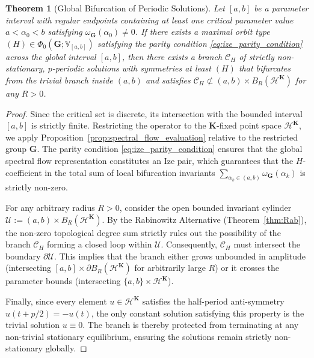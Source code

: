 \documentclass[twoside]{article}%
\newtheorem{theorem}{Theorem}[section]
\begin{document}
\begin{theorem}[Global Bifurcation of Periodic Solutions]\label{thm:global_bif_main}
Let $[a, b]$ be a parameter interval with regular endpoints containing at least one critical parameter value $a < \alpha_0 < b$ satisfying $\omega_{\bm G}(\alpha_0) \neq 0$. If there exists a maximal orbit type $(H) \in \Phi_0(\bm G; \mathbb V_{[a,b]})$ satisfying the parity condition \eqref{eq:ize_parity_condition} across the global interval $[a,b]$, then there exists a branch $\mathscr C_H$ of strictly non-stationary, $p$-periodic solutions with symmetries at least $(H)$ that bifurcates from the trivial branch inside $(a,b)$ and satisfies $\mathscr{C}_H \not\subset (a,b) \times B_R(\mathscr{H}^{\bm{K}})$ for any $R > 0$.
\end{theorem}
\begin{proof}
Since the critical set is discrete, its intersection with the bounded interval $[a,b]$ is strictly finite. Restricting the operator to the $\bm K$-fixed point space $\mathscr H^{\bm K}$, we apply Proposition~\ref{prop:spectral_flow_evaluation} relative to the restricted group $\bm G$. The parity condition \eqref{eq:ize_parity_condition} ensures that the global spectral flow representation constitutes an Ize pair, which guarantees that the $H$-coefficient in the total sum of local bifurcation invariants $\sum_{\alpha_k \in (a,b)} \omega_{\bm G}(\alpha_k)$ is strictly non-zero. 

For any arbitrary radius $R > 0$, consider the open bounded invariant cylinder $\mathcal U := (a,b) \times B_R(\mathscr H^{\bm K})$. By the Rabinowitz Alternative (Theorem~\ref{thm:Rab}), the non-zero topological degree sum strictly rules out the possibility of the branch $\mathscr C_H$ forming a closed loop within $\mathcal U$. Consequently, $\mathscr C_H$ must intersect the boundary $\partial \mathcal U$. This implies that the branch either grows unbounded in amplitude (intersecting $[a,b] \times \partial B_R(\mathscr H^{\bm K})$ for arbitrarily large $R$) or it crosses the parameter bounds (intersecting $\{a,b\} \times \mathscr H^{\bm K}$). 

Finally, since every element $u \in \mathscr H^{\bm K}$ satisfies the half-period anti-symmetry $u(t + p/2) = -u(t)$, the only constant solution satisfying this property is the trivial solution $u \equiv 0$. The branch is thereby protected from terminating at any non-trivial stationary equilibrium, ensuring the solutions remain strictly non-stationary globally.
\end{proof}
\end{document}

